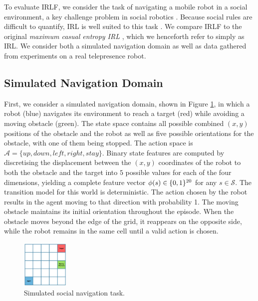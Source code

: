 \documentclass{aamas2016}
\begin{document}
To evaluate IRLF, we consider the task of navigating a mobile robot in a social environment, a key challenge problem in social robotics \cite{pacchierotti2006embodied}. Because social rules are difficult to quantify, IRL is well suited to this task \cite{henry2010learning,vasquez2014inverse}.  We compare IRLF to the original \emph{maximum casual entropy IRL} \cite{ziebart2008maximum}, which we henceforth refer to simply as IRL.  We  consider both a simulated navigation domain as well as data gathered from experiments on a real telepresence robot.

\subsection{Simulated Navigation Domain \label{sec:sim_nav}}

First, we consider a simulated navigation domain, shown in Figure \ref{fig:gridworld}, in which a robot (blue) navigates its environment to reach a target (red) while avoiding a moving
obstacle (green). The state space contains all possible combined $(x,y)$ positions of the obstacle and the robot as well as five possible orientations for the obstacle, with one of them being stopped. The action space is $\mathcal{A} = \{up,down,left,right,stay\}$. Binary state features are computed by discretising the displacement between the $(x,y)$ coordinates of the robot to both the obstacle and the target into $5$ possible values for each of the four dimensions, yielding a complete feature vector $\phi(s)\in\mathbb \{0,1\}^{20}$ for any $s\in\mathcal{S}$. The transition model for this world is deterministic. The action chosen by the robot results in the agent moving to that direction with probability 1. The moving obstacle maintains its initial orientation throughout the episode. When the obstacle moves beyond the edge of the grid, it reappears on the opposite side, while the robot remains in the same cell until a valid action is chosen.

\begin{figure}
\centering
    \includegraphics[width=0.20\textwidth]{images/gridworld.png}
  \caption{\small{Simulated social navigation task.}} \label{fig:gridworld}
\end{figure}
\end{document}
